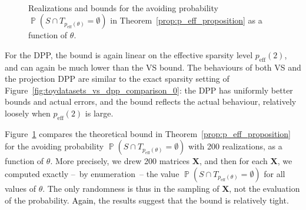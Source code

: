 \documentclass[twoside,11pt]{book}
\newcommand{\rev}[1]{\textcolor{black}{#1}}
\numberwithin{theorem}{chapter}
\numberwithin{definition}{chapter}
\numberwithin{proposition}{chapter}
\numberwithin{corollary}{chapter}
\numberwithin{example}{chapter}
\numberwithin{lemma}{chapter}
\numberwithin{assumption}{chapter}
\numberwithin{equation}{chapter}
\numberwithin{figure}{chapter}
\DeclareMathOperator{\eff}{\mathrm{eff}}
\DeclareMathOperator{\Prb}{\mathbb{P}}
\begin{document}
\begin{figure}
    \centering
{}
\\

\caption{Realizations and bounds for the avoiding probability $\Prb(S \cap T_{p_{\mathrm{eff}}(\theta)} = \emptyset)$ in Theorem~\ref{prop:p_eff_proposition} as a function of $\theta$.
\label{fig:toydatasets_avoiding_proba}}
\end{figure}

For the DPP, the bound is again linear on the effective sparsity level $p_{\mathrm{eff}}(2)$, and can again be much lower than the VS bound. The behaviours of both VS and the projection DPP are similar to the exact sparsity setting of Figure~\ref{fig:toydatasets_vs_dpp_comparison_0}: the DPP has uniformly better bounds and actual errors, and the bound reflects the actual behaviour, relatively loosely when $p_{\eff}(2)$ is large.

Figure~\ref{fig:toydatasets_avoiding_proba} compares the theoretical bound in Theorem~\ref{prop:p_eff_proposition} for the avoiding probability $\Prb(S \cap T_{p_{\mathrm{eff}}(\theta)} = \emptyset)$ with 200 realizations, as a function of $\theta$. More precisely, we drew 200 matrices $\bm{X}$, and then for each $\bm{X}$, we computed exactly --~by enumeration~-- the value $\Prb(S \cap T_{p_{\mathrm{eff}}(\theta)} = \emptyset)$ for all values of $\theta$. The only randomness is thus in the sampling of $\bm{X}$, not the evaluation of the probability. \rev{Again, } the results suggest that the bound is relatively tight.
\end{document}
